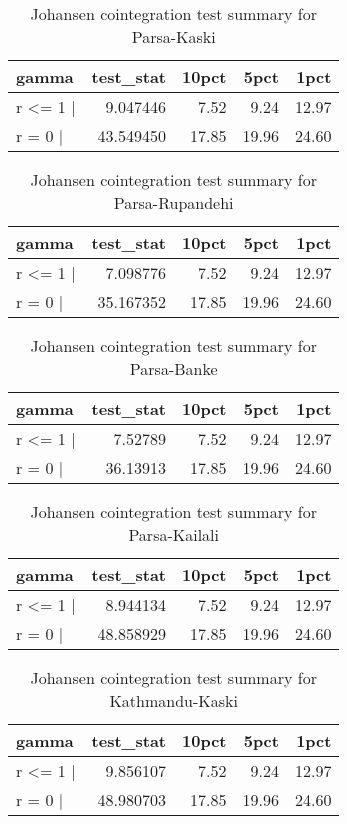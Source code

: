 \documentclass[12pt,]{article}
\begin{document}
\begin{longtable}[t]{lrrrr}
\caption{\label{tab:wheat-cajo-test}Johansen cointegration test summary for Parsa-Kaski}\\
\toprule
gamma & test\_stat & 10pct & 5pct & 1pct\\
\midrule
r <= 1 | & 9.047446 & 7.52 & 9.24 & 12.97\\
r = 0  | & 43.549450 & 17.85 & 19.96 & 24.60\\
\bottomrule
\end{longtable}

\begin{longtable}[t]{lrrrr}
\caption{\label{tab:wheat-cajo-test}Johansen cointegration test summary for Parsa-Rupandehi}\\
\toprule
gamma & test\_stat & 10pct & 5pct & 1pct\\
\midrule
r <= 1 | & 7.098776 & 7.52 & 9.24 & 12.97\\
r = 0  | & 35.167352 & 17.85 & 19.96 & 24.60\\
\bottomrule
\end{longtable}

\begin{longtable}[t]{lrrrr}
\caption{\label{tab:wheat-cajo-test}Johansen cointegration test summary for Parsa-Banke}\\
\toprule
gamma & test\_stat & 10pct & 5pct & 1pct\\
\midrule
r <= 1 | & 7.52789 & 7.52 & 9.24 & 12.97\\
r = 0  | & 36.13913 & 17.85 & 19.96 & 24.60\\
\bottomrule
\end{longtable}

\begin{longtable}[t]{lrrrr}
\caption{\label{tab:wheat-cajo-test}Johansen cointegration test summary for Parsa-Kailali}\\
\toprule
gamma & test\_stat & 10pct & 5pct & 1pct\\
\midrule
r <= 1 | & 8.944134 & 7.52 & 9.24 & 12.97\\
r = 0  | & 48.858929 & 17.85 & 19.96 & 24.60\\
\bottomrule
\end{longtable}

\begin{longtable}[t]{lrrrr}
\caption{\label{tab:wheat-cajo-test}Johansen cointegration test summary for Kathmandu-Kaski}\\
\toprule
gamma & test\_stat & 10pct & 5pct & 1pct\\
\midrule
r <= 1 | & 9.856107 & 7.52 & 9.24 & 12.97\\
r = 0  | & 48.980703 & 17.85 & 19.96 & 24.60\\
\bottomrule
\end{longtable}
\end{document}
